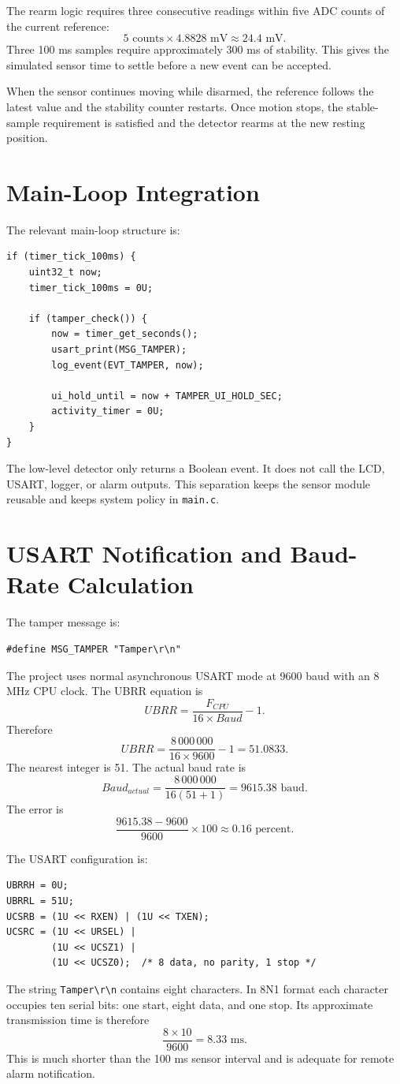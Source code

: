 \documentclass[11pt,a4paper]{article}
\begin{document}
The rearm logic requires three consecutive readings within five ADC counts of the current reference:
\[
5\text{ counts}\times4.8828\text{ mV}\approx24.4\text{ mV}.
\]
Three 100 ms samples require approximately 300 ms of stability. This gives the simulated sensor time to settle before a new event can be accepted.

When the sensor continues moving while disarmed, the reference follows the latest value and the stability counter restarts. Once motion stops, the stable-sample requirement is satisfied and the detector rearms at the new resting position.

\section{Main-Loop Integration}
The relevant main-loop structure is:
\begin{lstlisting}[style=cstyle]
if (timer_tick_100ms) {
    uint32_t now;
    timer_tick_100ms = 0U;

    if (tamper_check()) {
        now = timer_get_seconds();
        usart_print(MSG_TAMPER);
        log_event(EVT_TAMPER, now);

        ui_hold_until = now + TAMPER_UI_HOLD_SEC;
        activity_timer = 0U;
    }
}
\end{lstlisting}
The low-level detector only returns a Boolean event. It does not call the LCD, USART, logger, or alarm outputs. This separation keeps the sensor module reusable and keeps system policy in \texttt{main.c}.

\section{USART Notification and Baud-Rate Calculation}
The tamper message is:
\begin{lstlisting}[style=cstyle]
#define MSG_TAMPER "Tamper\r\n"
\end{lstlisting}
The project uses normal asynchronous USART mode at 9600 baud with an 8 MHz CPU clock. The UBRR equation is
\[
UBRR=\frac{F_{CPU}}{16\times Baud}-1.
\]
Therefore
\[
UBRR=\frac{8\,000\,000}{16\times9600}-1=51.0833.
\]
The nearest integer is 51. The actual baud rate is
\[
Baud_{actual}=\frac{8\,000\,000}{16(51+1)}=9615.38\text{ baud}.
\]
The error is
\[
\frac{9615.38-9600}{9600}\times100\approx0.16\text{ percent}.
\]

The USART configuration is:
\begin{lstlisting}[style=cstyle]
UBRRH = 0U;
UBRRL = 51U;
UCSRB = (1U << RXEN) | (1U << TXEN);
UCSRC = (1U << URSEL) |
        (1U << UCSZ1) |
        (1U << UCSZ0);  /* 8 data, no parity, 1 stop */
\end{lstlisting}
The string \texttt{Tamper\textbackslash r\textbackslash n} contains eight characters. In 8N1 format each character occupies ten serial bits: one start, eight data, and one stop. Its approximate transmission time is therefore
\[
\frac{8\times10}{9600}=8.33\text{ ms}.
\]
This is much shorter than the 100 ms sensor interval and is adequate for remote alarm notification.
\end{document}
